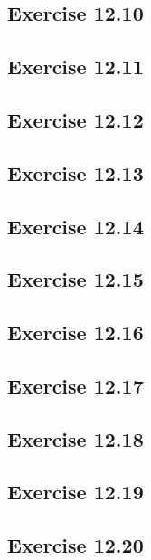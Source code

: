 \documentclass[a4paper,12pt]{article}
\begin{document}
\subsection*{Exercise 12.10}
\subsection*{Exercise 12.11}
\subsection*{Exercise 12.12}
\subsection*{Exercise 12.13}
\subsection*{Exercise 12.14}
\subsection*{Exercise 12.15}
\subsection*{Exercise 12.16}
\subsection*{Exercise 12.17}
\subsection*{Exercise 12.18}
\subsection*{Exercise 12.19}
\subsection*{Exercise 12.20}
\end{document}
